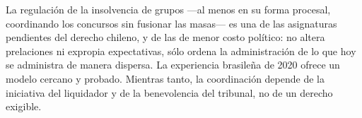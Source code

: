 \begin{foco}
La regulación de la insolvencia de grupos ---al menos en su forma procesal, coordinando los
concursos sin fusionar las masas--- es una de las asignaturas pendientes del derecho chileno, y de
las de menor costo político: no altera prelaciones ni expropia expectativas, sólo ordena la
administración de lo que hoy se administra de manera dispersa. La experiencia brasileña de 2020
ofrece un modelo cercano y probado. Mientras tanto, la coordinación depende de la iniciativa del
liquidador y de la benevolencia del tribunal, no de un derecho exigible.
\end{foco}
